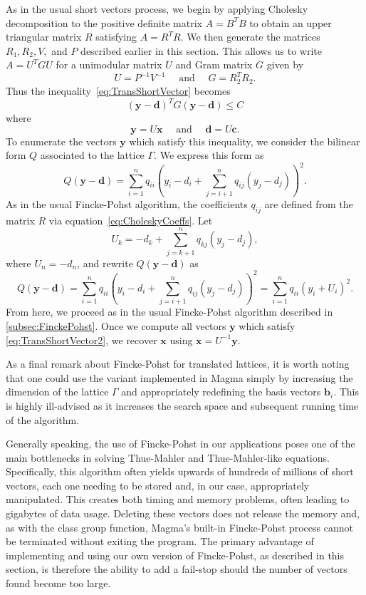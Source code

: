 As in the usual short vectors process, we begin by applying Cholesky decomposition to the positive definite matrix $A=B^TB$ to obtain an upper triangular matrix $R$ satisfying $A = R^TR$. We then generate the matrices $R_1, R_2, V,$ and $P$ described earlier in this section. This allows us to write $A = U^TGU$ for a unimodular matrix $U$ and Gram matrix $G$ given by
\[U = P^{-1}V^{-1} \quad \text{ and } \quad G = R_2^TR_2.\]
Thus the inequality~\eqref{eq:TransShortVector} becomes
\begin{equation} \label{eq:TransShortVector2}
(\mathbf{y}-\mathbf{d})^TG(\mathbf{y}-\mathbf{d}) \leq C
\end{equation}
where
\[\mathbf{y} = U\mathbf{x} \quad \text{ and } \quad \mathbf{d} = U\mathbf{c}.\]
To enumerate the vectors $\mathbf{y}$ which satisfy this inequality, we consider the bilinear form $Q$ associated to the lattice $\Gamma$. We express this form as
\[ Q(\mathbf{y}-\mathbf{d}) = \sum_{i=1}^n q_{ii}\left( y_i - d_i + \sum_{j=i+1}^n q_{ij}(y_j - d_j)\right)^2.\]
As in the usual Fincke-Pohst algorithm, the coefficients $q_{ij}$ are defined from the matrix $R$ via equation~\eqref{eq:CholeskyCoeffs}. Let
\[U_k = -d_k + \sum_{j = k+1}^n q_{kj}(y_j - d_j),\]
where $U_n = -d_n$, and rewrite $Q(\mathbf{y}-\mathbf{d})$ as
\[ Q(\mathbf{y}-\mathbf{d}) = \sum_{i=1}^n q_{ii}\left( y_i - d_i + \sum_{j=i+1}^n q_{ij}(y_j - d_j)\right)^2 = \sum_{i=1}^n q_{ii}\left( y_i + U_i\right)^2.\]
From here, we proceed as in the usual Fincke-Pohst algorithm described in \autoref{subsec:FinckePohst}. Once we compute all vectors $\mathbf{y}$ which satisfy \eqref{eq:TransShortVector2}, we recover $\mathbf{x}$ using $\mathbf{x} = U^{-1}\mathbf{y}$. 

As a final remark about Fincke-Pohst for translated lattices, it is worth noting that one could use the variant implemented in Magma simply by increasing the dimension of the lattice $\Gamma$ and appropriately redefining the basis vectors $\mathbf{b}_i$. This is highly ill-advised as it increases the search space and subsequent running time of the algorithm.  

Generally speaking, the use of Fincke-Pohst in our applications poses one of the main bottlenecks in solving Thue-Mahler and Thue-Mahler-like equations. Specifically, this algorithm often yields upwards of hundreds of millions of short vectors, each one needing to be stored and, in our case, appropriately manipulated. This creates both timing and memory problems, often leading to gigabytes of data usage. Deleting these vectors does not release the memory and, as with the class group function, Magma's built-in Fincke-Pohst process cannot be terminated without exiting the program. The primary advantage of implementing and using our own version of Fincke-Pohst, as described in this section, is therefore the ability to add a fail-stop should the number of vectors found become too large. 

